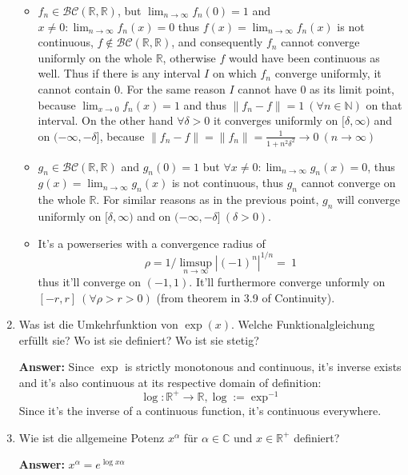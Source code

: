 \documentclass[11pt]{article}
\newcommand{\norm}[1]{\left\lVert#1\right\rVert}
\newcommand{\abs}[1]{\left|#1\right|}
\begin{document}
\begin{enumerate}
\begin{itemize}
    \item $f_n \in \mathcal{BC}(\mathbb{R},\mathbb{R})$, but $\lim_{n\to\infty}f_n(0) = 1$ and $x\neq0\colon \lim_{n\to\infty}f_n(x) = 0$ thus $f(x) = \lim_{n\to\infty}f_n(x)$ is not continuous, $f \notin \mathcal{BC}(\mathbb{R},\mathbb{R})$, and consequently $f_n$ cannot converge uniformly on the whole $\mathbb{R}$, otherwise $f$ would have been continuous as well. Thus if there is any interval $I$ on which $f_n$ converge uniformly, it cannot contain $0$. For the same reason $I$ cannot have $0$ as its limit point, because $\lim_{x\to0}f_n(x) = 1$ and thus $\norm{f_n - f} = 1~(\forall n \in \mathbb{N})$ on that interval. On the other hand $\forall \delta > 0$ it converges uniformly on  $[\delta, \infty)$ and on $(-\infty, -\delta]$, because $\norm{f_n - f} = \norm{f_n} = \frac{1}{1+n^2\delta^2} \to 0~(n\to\infty)$
    \item $g_n \in \mathcal{BC}(\mathbb{R},\mathbb{R})$ and $g_n(0) = 1$ but $\forall x\neq0\colon \lim_{n\to\infty}g_n(x) = 0$, thus $g(x) = \lim_{n\to\infty}g_n(x)$ is not continuous, thus $g_n$ cannot converge on the whole $\mathbb{R}$. For similar reasons as in the previous point, $g_n$ will converge uniformly on  $[\delta, \infty)$ and on $(-\infty, -\delta]~(\delta > 0)$.
    \item It's a powerseries with a convergence radius of $$\rho =1/\limsup_{n\to\infty}\abs{(-1)^n}^{1/n} =~1$$ thus it'll converge on $(-1, 1)$. It'll furthermore converge unformly on $[-r, r]~(\forall\rho > r > 0)$ (from theorem in 3.9 of Continuity).
\end{itemize}


\item Was ist die Umkehrfunktion von $\exp(x)$. Welche Funktionalgleichung erfüllt sie? Wo
ist sie definiert? Wo ist sie stetig?

\textbf{Answer:} Since $\exp$ is strictly monotonous and continuous, it's inverse exists and it's also continuous at its respective domain of definition: $$\log\colon \mathbb{R}^+ \to \mathbb{R}, \log := \exp^{-1}$$
Since it's the inverse of a continuous function, it's continuous everywhere.
\item Wie ist die allgemeine Potenz $x^\alpha$ für $\alpha \in \mathbb{C}$ und $x \in \mathbb{R}^+$ definiert?

\textbf{Answer:} $x^\alpha = e^{\log{x} \alpha}$

\end{enumerate}
\end{document}
